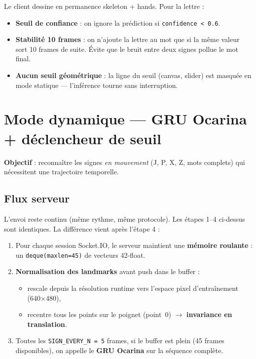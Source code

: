 \documentclass[11pt,a4paper]{article}
\begin{document}
Le client dessine en permanence skeleton + hands. Pour la lettre :

\begin{itemize}[leftmargin=*, itemsep=2pt]
  \item \textbf{Seuil de confiance} : on ignore la pr\'ediction si
        \texttt{confidence < 0.6}.
  \item \textbf{Stabilit\'e 10 frames} : on n'ajoute la lettre au mot que
        si la m\^eme valeur sort 10 frames de suite. \'Evite que le bruit
        entre deux signes pollue le mot final.
  \item \textbf{Aucun seuil g\'eom\'etrique} : la ligne du seuil
        (canvas, slider) est masqu\'ee en mode statique --- l'inf\'erence
        tourne sans interruption.
\end{itemize}

\section{Mode dynamique --- GRU Ocarina + d\'eclencheur de seuil}

\textbf{Objectif} : reconna\^itre les signes \emph{en mouvement} (J, P, X, Z,
mots complets) qui n\'ecessitent une trajectoire temporelle.

\subsection*{Flux serveur}

L'envoi reste continu (m\^eme rythme, m\^eme protocole). Les \'etapes 1--4
ci-dessus sont identiques. La diff\'erence vient apr\`es l'\'etape 4 :

\begin{enumerate}[leftmargin=*, itemsep=2pt, start=5]
  \item Pour chaque session Socket.IO, le serveur maintient une
        \textbf{m\'emoire roulante} : un \texttt{deque(maxlen=45)} de
        vecteurs 42-float.
  \item \textbf{Normalisation des landmarks} avant push dans le buffer :
        \begin{itemize}[leftmargin=*, itemsep=0pt]
          \item rescale depuis la r\'esolution runtime vers l'espace
                pixel d'entra\^inement (640$\times$480),
          \item recentre tous les points sur le poignet (point~0) $\to$
                \textbf{invariance en translation}.
        \end{itemize}
  \item Toutes les \texttt{SIGN\_EVERY\_N = 5} frames, si le buffer est
        plein (45 frames disponibles), on appelle le \textbf{GRU Ocarina}
        sur la s\'equence compl\`ete.
\end{enumerate}
\end{document}
